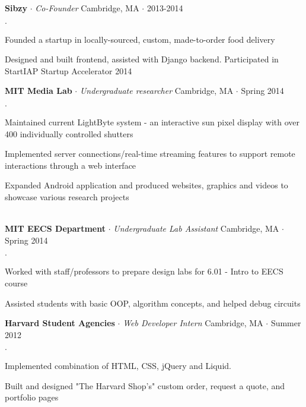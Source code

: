 \documentclass{article}
\newcommand{\employer}[4]{{ \textbf{#1} $\cdot$ \emph{#3} \hfill #4 $\cdot$ #2 }}
\newenvironment{achievements}{\begin{list}{$\cdot$}{\topsep 0pt \itemsep -2pt}}{\vspace*{4pt}\end{list}}
\begin{document}
  \employer{Sibzy}{2013-2014}{Co-Founder}{Cambridge, MA}
    \begin{achievements}
                \item{Founded a startup in locally-sourced, custom, made-to-order food delivery}
                \item{Designed and built frontend, assisted with Django backend. Participated in StartIAP Startup Accelerator 2014}

    \end{achievements}

\employer{MIT Media Lab}{Spring 2014}{Undergraduate researcher}{Cambridge, MA}
    \begin{achievements}
                \item{Maintained current LightByte system - an interactive sun pixel display with over 400 individually controlled shutters }
                \item { Implemented server connections/real-time streaming features to support remote interactions through a web interface }
                \item{Expanded Android application and produced websites, graphics and videos to showcase various research projects }

    \end{achievements}
  \\

\employer{MIT EECS Department}{Spring 2014}{Undergraduate Lab Assistant}{Cambridge, MA}
    \begin{achievements}
                \item{Worked with staff/professors to prepare design labs for 6.01 - Intro to EECS course}
                \item{Assisted students with basic OOP, algorithm concepts, and helped debug circuits}

    \end{achievements}

\employer{Harvard Student Agencies}{Summer 2012}{Web Developer Intern}{Cambridge, MA}
    \begin{achievements}
                \item{Implemented combination of HTML, CSS, jQuery and Liquid.}
                \item { Built and designed "The Harvard Shop's" custom order, request a quote, and portfolio pages}

    \end{achievements}
\end{document}
